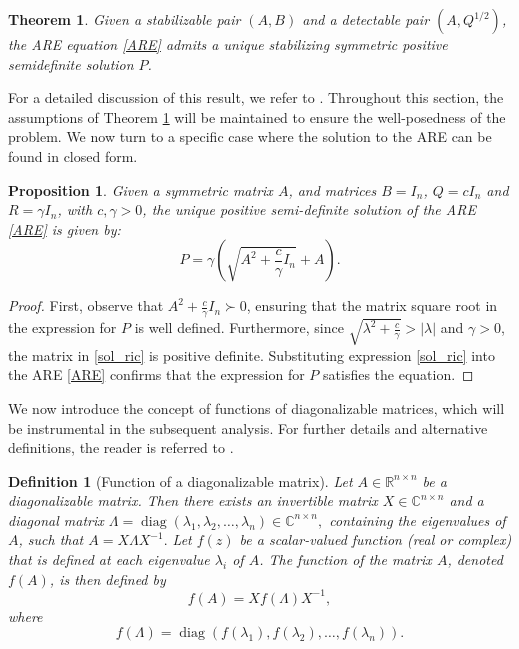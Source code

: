 \documentclass{article}
\newtheorem{theorem}[lemma]{Theorem}
\newtheorem{definition}{Definition}[section]
\newtheorem{prop}{Proposition}[section]
\begin{document}
\begin{theorem}
Given a stabilizable pair $(A,B)$ and a detectable pair $(A,Q^{1/2})$, the ARE equation \eqref{ARE} admits a unique stabilizing symmetric positive semidefinite solution $P$.
\label{ex_uni_ARE}
\end{theorem}

For a detailed discussion of this result, we refer to \cite{lancaster1995algebraic}. Throughout this section, the assumptions of Theorem \ref{ex_uni_ARE} will be maintained to ensure the well-posedness of the problem. We now turn to a specific case where the solution to the ARE can be found in closed form.
\begin{prop} \label{prop_sol_ric}
Given a symmetric matrix $A$, and matrices $B =  I_n$, $Q = c I_n$ and $R= \gamma I_n$, with $c,\gamma>0$, the unique positive semi-definite solution of the ARE \eqref{ARE} is given by:
\begin{equation}
P = \gamma \left(\sqrt{A^2+\frac{c}{\gamma} I_n} + A\right).
\label{sol_ric}
\end{equation}

\end{prop}

\begin{proof}

First, observe that $A^2+\frac{c}{\gamma} I_n \succ 0$, ensuring that the matrix square root in the expression for $P$ is well defined. Furthermore, since $\sqrt{\lambda^2 +\frac{c}{\gamma}}> |\lambda|$ and $\gamma>0$, the matrix in \eqref{sol_ric} is positive definite.
Substituting expression \eqref{sol_ric} into the ARE \eqref{ARE} confirms that the expression for $P$ satisfies the equation.
\end{proof}

We now introduce the concept of functions of diagonalizable matrices, which will be instrumental in the subsequent analysis. For further details and alternative definitions, the reader is referred to \cite{higham2008functions}.

\begin{definition}[Function of a diagonalizable matrix]
Let $A \in  \mathbb{R}^{n \times n} $ be a diagonalizable matrix. Then there exists an invertible matrix \( X \in \mathbb{C}^{n \times n} \) and a diagonal matrix  
$
\Lambda = \operatorname{diag}(\lambda_1, \lambda_2, \dots, \lambda_n) \in \mathbb{C}^{n \times n},
$
containing the eigenvalues of \( A \), such that  
$ 
A = X \Lambda X^{-1}.
$
Let \( f(z) \) be a scalar-valued function (real or complex) that is defined at each eigenvalue \( \lambda_i \) of \( A \). The function of the matrix \( A \), denoted \( f(A) \), is then defined by  
\[
f(A) = X f(\Lambda) X^{-1},
\]
where  
\[
f(\Lambda) = \operatorname{diag}(f(\lambda_1), f(\lambda_2), \dots, f(\lambda_n)).
\]
\end{definition}
\end{document}
